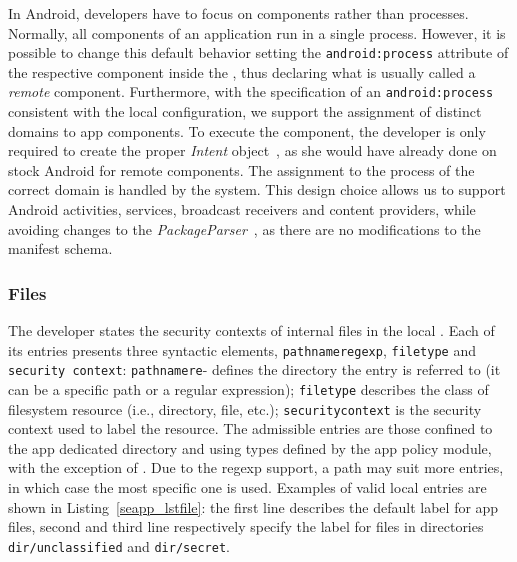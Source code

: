 In Android, developers have to focus on components rather than
processes.  Normally, all components of an application run in a single
process.  However, it is possible to change this default behavior
setting the \texttt{android:process} attribute of the respective
component inside the \manifest, thus declaring what is usually called
a {\em remote} component.  Furthermore, with the specification of an
\texttt{android:process} consistent with the local \seappcontexts
configuration, we support the assignment of distinct domains to app
components.  To execute the component, the developer is only required
to create the proper \emph{Intent} object~\cite{seapp_intentsstart},
as she would have already done on stock Android for remote components.
The assignment to the process of the correct domain is handled by the
system.  This design choice allows us to support Android activities,
services, broadcast receivers and content providers, while avoiding
changes to the \textit{PackageParser}~\cite{seapp_packparse}, as there
are no modifications to the manifest schema.

\subsubsection{Files}\label{subsub:seapp_files_control}

The developer states the \sel security contexts of internal files in
the local \filecontexts.  Each of its entries presents three syntactic
elements, \texttt{pathname\textunderscore regexp},
\texttt{file\textunderscore type} and \texttt{security\textunderscore
  context}: \texttt{pathname\textunderscore re}- 
defines the directory the entry is referred to (it can be a specific
path or a regular expression); \texttt{file\textunderscore type}
describes the class of filesystem resource (i.e., directory, file,
etc.); \texttt{security\textunderscore context} is the security
context used to label the resource.  The admissible entries are those
confined to the app dedicated directory and using types defined by the
app policy module, with the exception of \appdatafile.  Due to the
regexp support, a path may suit more entries, in which case the most
specific one is used.  Examples of valid local \filecontexts entries
are shown in Listing~\ref{seapp_lstfile}: the first line describes the
default label for app files, second and third line respectively
specify the label for files in directories {\tt dir/unclassified} and
{\tt dir/secret}.

